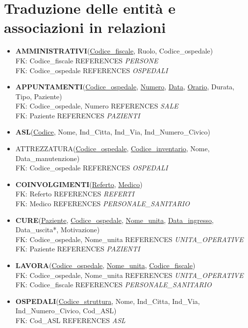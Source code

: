 \documentclass[a4paper,12pt]{report}
\begin{document}
\section{Traduzione delle entità e associazioni in relazioni}
\begin{itemize}
  \item \textbf{AMMINISTRATIVI}(\underline{Codice\_fiscale}, Ruolo, Codice\_ospedale) 
  \\ FK: Codice\_fiscale REFERENCES \emph{PERSONE}
  \\ FK: Codice\_ospedale REFERENCES \emph{OSPEDALI}
  \item \textbf{APPUNTAMENTI}(\underline{Codice\_ospedale}, \underline{Numero}, \underline{Data}, \underline{Orario}, Durata, Tipo, Paziente)
  \\ FK: Codice\_ospedale, Numero REFERENCES \emph{SALE}
  \\ FK: Paziente REFERENCES \emph{PAZIENTI}
  \item \textbf{ASL}(\underline{Codice}, Nome, Ind\_Citta, Ind\_Via, Ind\_Numero\_Civico)
  \item ATTREZZATURA(\underline{Codice\_ospedale}, \underline{Codice\_inventario}, Nome, Data\_manutenzione)
  \\ FK: Codice\_ospedale REFERENCES \emph{OSPEDALI}
  \item \textbf{COINVOLGIMENTI}(\underline{Referto}, \underline{Medico})
  \\ FK: Referto REFERENCES \emph{REFERTI}
  \\ FK: Medico REFERENCES \emph{PERSONALE\_SANITARIO}
  \item \textbf{CURE}(\underline{Paziente}, \underline{Codice\_ospedale}, \underline{Nome\_unita}, \underline{Data\_ingresso}, Data\_uscita*, Motivazione)
  \\ FK: Codice\_ospedale, Nome\_unita REFERENCES \emph{UNITA\_OPERATIVE}
  \\ FK: Paziente REFERENCES \emph{PAZIENTI}
  \item \textbf{LAVORA}(\underline{Codice\_ospedale}, \underline{Nome\_unita}, \underline{Codice\_fiscale})
  \\ FK: Codice\_ospedale, Nome\_unita REFERENCES \emph{UNITA\_OPERATIVE}
  \\ FK: Codice\_fiscale REFERENCES \emph{PERSONALE\_SANITARIO}
  \item \textbf{OSPEDALI}(\underline{Codice\_struttura}, Nome, Ind\_Citta, Ind\_Via, Ind\_Numero\_Civico, Cod\_ASL)
  \\ FK: Cod\_ASL REFERENCES \emph{ASL}

\end{itemize}
\end{document}
